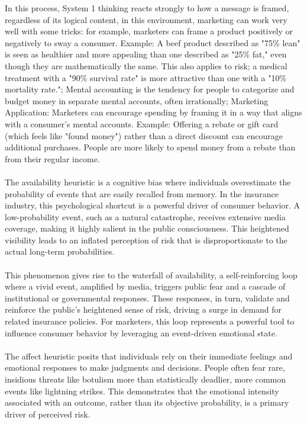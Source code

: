 \documentclass{article}
\begin{document}
In this process, System 1 thinking reacts strongly to how a message is framed, regardless of its logical content, in this environment, marketing can work very well with some tricks: for example, marketers can frame a product positively or negatively to sway a consumer.
Example: A beef product described as "75\% lean" is seen as healthier and more appealing than one described as "25\% fat," even though they are mathematically the same. This also applies to risk; a medical treatment with a "90\% survival rate" is more attractive than one with a "10\% mortality rate."; Mental accounting is the tendency for people to categorize and budget money in separate mental accounts, often irrationally; Marketing Application: Marketers can encourage spending by framing it in a way that aligns with a consumer's mental accounts. Example: Offering a rebate or gift card (which feels like "found money") rather than a direct discount can encourage additional purchases. People are more likely to spend money from a rebate than from their regular income.\\\\
The availability heuristic is a cognitive bias where individuals overestimate the probability of events that are easily recalled from memory. In the insurance industry, this psychological shortcut is a powerful driver of consumer behavior. A low-probability event, such as a natural catastrophe, receives extensive media coverage, making it highly salient in the public consciousness. This heightened visibility leads to an inflated perception of risk that is disproportionate to the actual long-term probabilities.\\\\
This phenomenon gives rise to the waterfall of availability, a self-reinforcing loop where a vivid event, amplified by media, triggers public fear and a cascade of institutional or governmental responses. These responses, in turn, validate and reinforce the public's heightened sense of risk, driving a surge in demand for related insurance policies. For marketers, this loop represents a powerful tool to influence consumer behavior by leveraging an event-driven emotional state.\\\\
The affect heuristic posits that individuals rely on their immediate feelings and emotional responses to make judgments and decisions. People often fear rare, insidious threats like botulism more than statistically deadlier, more common events like lightning strikes. This demonstrates that the emotional intensity associated with an outcome, rather than its objective probability, is a primary driver of perceived risk.
\end{document}
